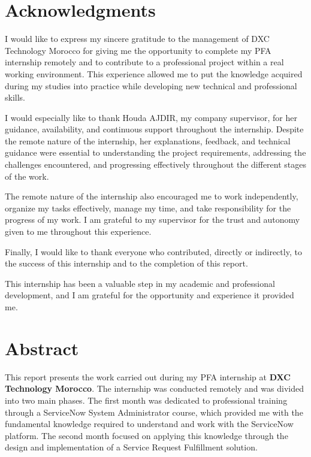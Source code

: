 \documentclass[12pt,a4paper]{report}
\begin{document}
\chapter*{Acknowledgments}
I would like to express my sincere gratitude to the management of DXC Technology Morocco 
for giving me the opportunity to complete my PFA internship remotely and to contribute
to a professional project within a real working environment. This experience allowed me to put 
the knowledge acquired during my studies into practice while developing new technical and professional skills.

I would especially like to thank Houda AJDIR, my company supervisor, for her guidance, availability,
and continuous support throughout the internship. Despite the remote nature of the internship, her explanations, 
feedback, and technical guidance were essential to understanding the project requirements, addressing the challenges 
encountered, and progressing effectively throughout the different stages of the work.

The remote nature of the internship also encouraged me to work independently, organize my tasks effectively, 
manage my time, and take responsibility for the progress of my work. I am grateful to my supervisor for the trust 
and autonomy given to me throughout this experience.

Finally, I would like to thank everyone who contributed, directly or indirectly, to the success 
of this internship and to the completion of  this report.

This internship has been a valuable step in my academic and professional development, 
and I am grateful for the opportunity and experience it provided me.


\chapter*{Abstract}
This report presents the work carried out during my PFA internship at \textbf{DXC Technology Morocco}.
The internship was conducted remotely and was divided into two main phases. The first month was dedicated
to professional training through a ServiceNow System Administrator course, which provided me with 
the fundamental knowledge required to understand and work with the ServiceNow platform. 
The second month focused on applying this knowledge through the design and implementation of 
a Service Request Fulfillment solution.
\end{document}
